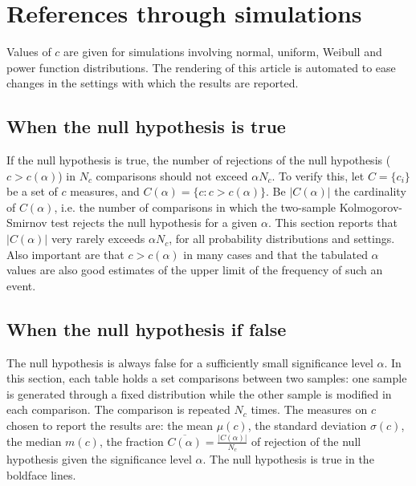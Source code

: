 \documentclass[%
	aip,
	jmp,%
	amsmath,amssymb,
	reprint,%
]{revtex4-1}
\begin{document}
\section{References through simulations}\label{sec:simulations}
Values of $c$ are given for simulations involving
normal, uniform, Weibull and power function distributions.
The rendering of this article is automated to ease changes in
the settings with which the results are reported.


\subsection{When the null hypothesis is true}
If the null hypothesis is true, the number
of rejections of the null hypothesis ($c>c(\alpha)$)
in $N_c$ comparisons should not exceed $\alpha N_c$.
To verify this, let $C=\{c_i\}$ be a set of $c$ measures,
and $C(\alpha)=\{c : c>c(\alpha)\}$.
Be $|C(\alpha)|$ the cardinality of $C(\alpha)$,
i.e. the number of comparisons in which the two-sample Kolmogorov-Smirnov
test rejects the null hypothesis for a given $\alpha$.
This section reports that
$|C(\alpha)|$ very rarely exceeds $\alpha N_c$,
for all probability distributions and settings.
Also important are that
$c>c(\alpha)$ in many cases
and that the tabulated $\alpha$ values
are also good estimates of the upper limit
of the frequency of such an event.







\FloatBarrier
\subsection{When the null hypothesis if false}
The null hypothesis is always false for a sufficiently small
significance level $\alpha$.
In this section,
each table holds a set comparisons between two samples:
one sample is generated through a
fixed distribution while the other
sample is modified in each comparison.
The comparison is repeated $N_c$ times.
The measures on $c$ chosen to report the results are:
the mean $\mu(c)$, the standard deviation $\sigma(c)$,
the median $m(c)$,
the  fraction
$\overline{C(\alpha)}=\frac{|C(\alpha)|}{N_c}$
of rejection of the null hypothesis given the significance level $\alpha$.
The null hypothesis is true in the boldface lines.
\end{document}

